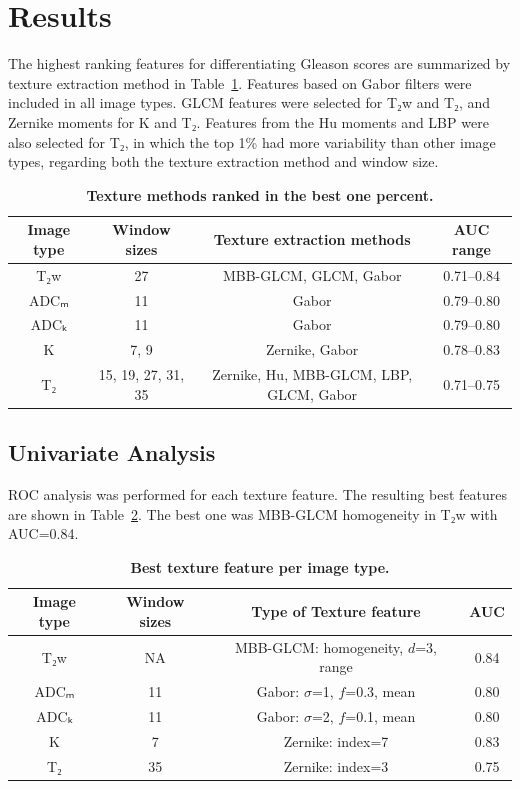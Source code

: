 \section{Results}

The highest ranking features for differentiating Gleason scores are summarized
by texture extraction method in Table~\ref{tab:texture_best1p}. Features based
on Gabor filters were included in all image types. GLCM features were selected
for T₂w and T₂, and Zernike moments for K and T₂. Features from the Hu
moments and LBP were also selected for T₂, in which the top 1\% had more
variability than other image types, regarding both the texture extraction method
and window size.

\begin{table}[!h]
\begin{adjustwidth}{-2.25in}{0in}
\centering
\caption{{\bf Texture methods ranked in the best one percent.}}%
\label{tab:texture_best1p}

\begin{tabular}{c c c c}
\hline
Image type & Window sizes & Texture extraction methods & AUC range \\
\hline
T₂w & 27 & MBB-GLCM, GLCM, Gabor & 0.71--0.84 \\
ADCₘ & 11 & Gabor & 0.79--0.80 \\
ADCₖ & 11 & Gabor & 0.79--0.80 \\
K & 7, 9 & Zernike, Gabor & 0.78--0.83 \\
T₂ & 15, 19, 27, 31, 35 & Zernike, Hu, MBB-GLCM, LBP, GLCM, Gabor & 0.71--0.75 \\
\hline
\end{tabular}
\end{adjustwidth}
\end{table}


\subsection{Univariate Analysis}

ROC analysis was performed for each texture feature. The resulting best features
are shown in Table~\ref{tab:texture_imagetype}. The best one was MBB-GLCM
homogeneity in T₂w with AUC=0.84.

\begin{table}[!h]
\centering
\caption{{\bf Best texture feature per image type.}}%
\label{tab:texture_imagetype}

\begin{tabular}{c c c c}
\hline
Image type & Window sizes & Type of Texture feature & AUC \\
\hline
T₂w & NA & MBB-GLCM\@: homogeneity, $d$=3, range & 0.84 \\
ADCₘ & 11 & Gabor: $\sigma$=1, $f$=0.3, mean & 0.80 \\
ADCₖ & 11 & Gabor: $\sigma$=2, $f$=0.1, mean & 0.80 \\
K & 7 & Zernike: index=7 & 0.83 \\
T₂ & 35 & Zernike: index=3 & 0.75 \\
\hline
\end{tabular}
\end{table}

